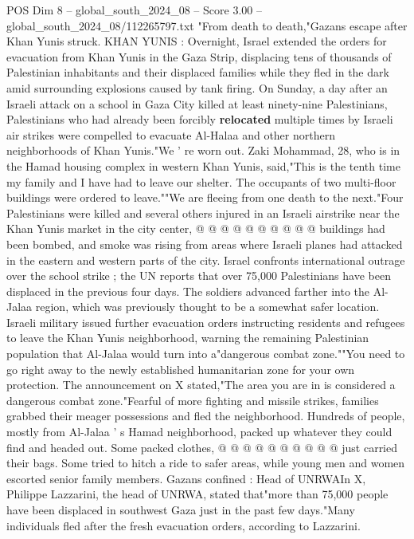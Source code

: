 \begin{textsample}{POS Dim 8 – global\_south\_2024\_08 – Score 3.00 – global\_south\_2024\_08/112265797.txt}  \label{ex:f8_pos_379}
"From death to death,"Gazans escape after Khan Yunis struck.
KHAN YUNIS : Overnight, Israel extended the orders for evacuation from Khan Yunis in the Gaza Strip, displacing tens of thousands of Palestinian inhabitants and their displaced families while they fled in the dark amid surrounding explosions caused by tank firing.
On Sunday, a day after an Israeli attack on a school in Gaza City killed at least ninety-nine Palestinians, Palestinians who had already been forcibly \textbf{relocated} multiple times by Israeli air strikes were compelled to evacuate Al-Halaa and other northern neighborhoods of Khan Yunis."We ' re worn out.
Zaki Mohammad, 28, who is in the Hamad housing complex in western Khan Yunis, said,"This is the tenth time my family and I have had to leave our shelter.
The occupants of two multi-floor buildings were ordered to leave.""We are fleeing from one death to the next."Four Palestinians were killed and several others injured in an Israeli airstrike near the Khan Yunis market in the city center, @ @ @ @ @ @ @ @ @ @ buildings had been bombed, and smoke was rising from areas where Israeli planes had attacked in the eastern and western parts of the city.
Israel confronts international outrage over the school strike ; the UN reports that over 75,000 Palestinians have been displaced in the previous four days.
The soldiers advanced farther into the Al-Jalaa region, which was previously thought to be a somewhat safer location.
Israeli military issued further evacuation orders instructing residents and refugees to leave the Khan Yunis neighborhood, warning the remaining Palestinian population that Al-Jalaa would turn into a"dangerous combat zone.""You need to go right away to the newly established humanitarian zone for your own protection.
The announcement on X stated,"The area you are in is considered a dangerous combat zone."Fearful of more fighting and missile strikes, families grabbed their meager possessions and fled the neighborhood.
Hundreds of people, mostly from Al-Jalaa ' s Hamad neighborhood, packed up whatever they could find and headed out.
Some packed clothes, @ @ @ @ @ @ @ @ @ @ just carried their bags.
Some tried to hitch a ride to safer areas, while young men and women escorted senior family members.
Gazans confined : Head of UNRWAIn X, Philippe Lazzarini, the head of UNRWA, stated that"more than 75,000 people have been displaced in southwest Gaza just in the past few days."Many individuals fled after the fresh evacuation orders, according to Lazzarini.

\end{textsample}
